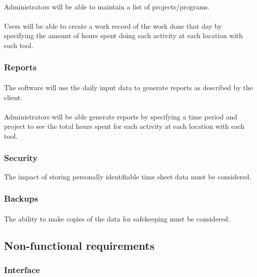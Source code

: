 \documentclass[12pt]{article}
\begin{document}
\paragraph{} Administrators will be able to maintain a list of projects/programs.
\paragraph{} Users will be able to create a work record of the work done that day by specifying the amount of hours spent doing each activity at each location with each tool.


\subsubsection{Reports}\label{sec:Reports}
\paragraph{} The software will use the daily input data to generate reports as described by the client.
\paragraph{} Administrators will be able generate reports by specifying a time period and project to see the total hours spent for each activity at each location with each tool.

\subsubsection{Security}\label{sec:Security}
The impact of storing personally identifiable time sheet data must be considered.

\subsubsection{Backups}\label{sec:Backups}
\paragraph{} The ability to make copies of the data for safekeeping must be considered.

\subsection{Non-functional requirements}
\subsubsection{Interface}\label{sec:Interface}
\end{document}
